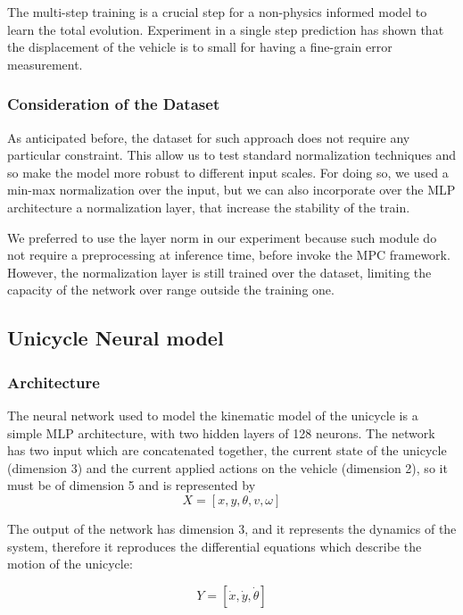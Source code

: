 The multi-step training is a crucial step for a non-physics informed model to learn the total evolution. 
Experiment in a single step prediction has shown that the displacement of the vehicle is to small for having a fine-grain error measurement. 

\subsubsection{Consideration of the Dataset}
As anticipated before, the dataset for such approach does not require any particular constraint. This allow us to test standard normalization techniques
and so make the model more robust to different input scales. 
For doing so, we used a min-max normalization over the input, but we can also incorporate over the MLP architecture a normalization layer, that increase the stability of the train.

We preferred to use the layer norm in our experiment because such module do not require a preprocessing at inference time, before invoke the MPC framework.
However, the normalization layer is still trained over the dataset, limiting the capacity of the network over range outside the training one. 

\subsection{Unicycle Neural model}
\subsubsection{Architecture}
The neural network used to model the kinematic model of the unicycle is a simple MLP architecture,
with two hidden layers of 128 neurons. The network has two input which are concatenated together,
the current state of the unicycle (dimension 3) and the current applied actions on the vehicle (dimension 2),
so it must be of dimension 5 and is represented by 
\begin{equation}
    X = [x, y, \theta, v, \omega]
\end{equation}

The output of the network has dimension 3, and it represents the dynamics of the system, therefore it reproduces 
the differential equations which describe the motion of the unicycle:

\begin{equation}
    Y = [\dot{x}, \dot{y}, \dot{\theta}]
\end{equation}
